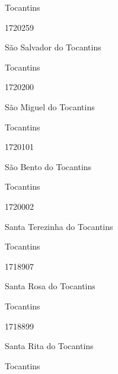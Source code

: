 \documentclass[
  letterpaper,
]{report}
\begin{document}
\n      

Tocantins

\n      

1720259

\n      

São Salvador do Tocantins

\n    

\n    

\n      

Tocantins

\n      

1720200

\n      

São Miguel do Tocantins

\n    

\n    

\n      

Tocantins

\n      

1720101

\n      

São Bento do Tocantins

\n    

\n    

\n      

Tocantins

\n      

1720002

\n      

Santa Terezinha do Tocantins

\n    

\n    

\n      

Tocantins

\n      

1718907

\n      

Santa Rosa do Tocantins

\n    

\n    

\n      

Tocantins

\n      

1718899

\n      

Santa Rita do Tocantins

\n    

\n    

\n      

Tocantins

\n      
\end{document}
